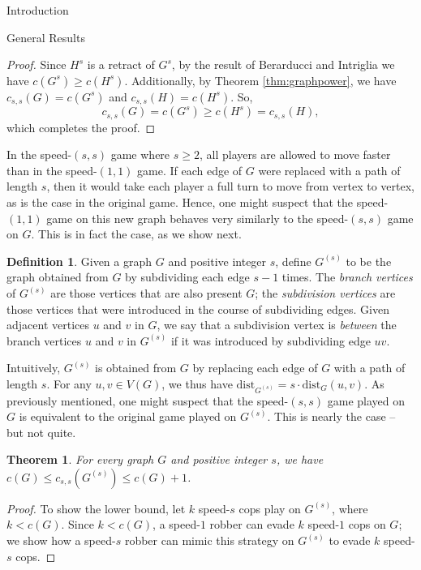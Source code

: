 \documentclass[12pt]{amsart}
\newtheorem{theorem}[lemma]{Theorem}
\theoremstyle{definition}
\newtheorem{definition}[lemma]{Definition}
\newcommand{\speeds}{c_{s,s}}
\begin{document}
\begin{section}{Introduction}
\begin{section}{General Results}
\begin{proof}
Since $H^s$ is a retract of $G^s$, by the result of Berarducci and Intriglia we have $c(G^s) \ge c(H^s)$.  Additionally, by Theorem \ref{thm:graphpower}, we have $\speeds(G) = c(G^s)$ and $\speeds(H) = c(H^s)$.  So,
$$\speeds(G) = c(G^s) \ge c(H^s) = \speeds(H),$$
which completes the proof.
\end{proof}

In the speed-$(s,s)$ game where $s\ge 2$, all players are allowed to move faster than in the speed-$(1,1)$ game.  If each edge of $G$ were replaced with a path of length $s$, then it would take each player a full turn to move from vertex to vertex, as is the case in the original game.  Hence, one might suspect that the speed-$(1,1)$ game on this new graph behaves very similarly to the speed-$(s,s)$ game on $G$.  This is in fact the case, as we show next.

\begin{definition}
Given a graph $G$ and positive integer $s$, define $G^{(s)}$ to be the graph obtained from $G$ by subdividing each edge $s-1$ times.  The \textit{branch vertices} of $G^{(s)}$ are those vertices that are also present $G$; the \textit{subdivision vertices} are those vertices that were introduced in the course of subdividing edges.  Given adjacent vertices $u$ and $v$ in $G$, we say that a subdivision vertex is \textit{between} the branch vertices $u$ and $v$ in $G^{(s)}$ if it was introduced by subdividing edge $uv$.
\end{definition}

Intuitively, $G^{(s)}$ is obtained from $G$ by replacing each edge of $G$ with a path of length $s$.  For any $u,v \in V(G)$, we thus have $\textrm{dist}_{G^{(s)}} = s\cdot \textrm{dist}_G(u,v)$.  As previously mentioned, one might suspect that the speed-$(s,s)$ game played on $G$ is equivalent to the original game played on $G^{(s)}$.  This is nearly the case -- but not quite. 

\begin{theorem}\label{thm:subdivision}
    For every graph $G$ and positive integer $s$, we have $c(G)\le \speeds(G^{(s)})\le c(G)+1$.
\end{theorem}
\begin{proof}
    To show the lower bound, let $k$ speed-$s$ cops play on $G^{(s)}$, where $k<c(G)$.   Since $k < c(G)$, a speed-$1$ robber can evade $k$ speed-$1$ cops on $G$; we show how a speed-$s$ robber can mimic this strategy on $G^{(s)}$ to evade $k$ speed-$s$ cops.
    

\end{proof}
\end{section}
\end{section}
\end{document}
